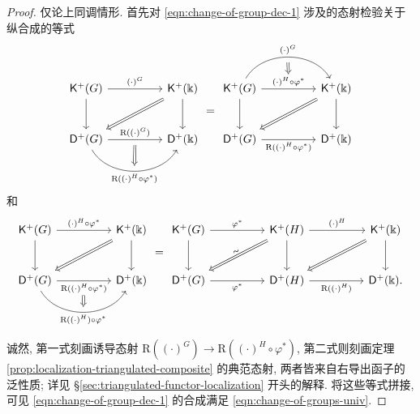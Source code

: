 \begin{proof}
	仅论上同调情形. 首先对 \eqref{eqn:change-of-group-dec-1} 涉及的态射检验关于纵合成的等式
	\[\begin{tikzcd}[column sep=huge, row sep=large]
		\cate{K}^+(G) \arrow[r, "{(\cdot)^G}"] \arrow[d] & \cate{K}^+(\Bbbk) \arrow[d] \arrow[Rightarrow, ld] \\
		\cate{D}^+(G) \arrow[r, "{\mathrm{R}((\cdot)^G)}", ""' {name=D}] \arrow[r, bend right=60, "" {name=U}, "{\mathrm{R}((\cdot)^H \circ \varphi^*)}"'] & \cate{D}^+(\Bbbk) \arrow[Rightarrow, from=D, to=U]
	\end{tikzcd} = \begin{tikzcd}[column sep=huge, row sep=large]
		\cate{K}^+(G) \arrow[r, "{(\cdot)^H \circ \varphi^*}" {name=D}] \arrow[d] \arrow[r, bend left=60, ""' {name=U}, "{(\cdot)^G}"] & \cate{K}^+(\Bbbk) \arrow[d] \arrow[Rightarrow, ld] \\
		\cate{D}^+(G) \arrow[r, "{\mathrm{R}((\cdot)^H \circ \varphi^* ) }"'] & \cate{D}^+(\Bbbk) \arrow[Rightarrow, from=U, to=D]
	\end{tikzcd}\]
	和
	\[\begin{tikzcd}[column sep=huge, row sep=large]
		\cate{K}^+(G) \arrow[r, "{(\cdot)^H \circ \varphi^*}"] \arrow[d] & \cate{K}^+(\Bbbk) \arrow[d] \arrow[Rightarrow, ld] \\
		\cate{D}^+(G) \arrow[r, "{\mathrm{R}((\cdot)^H \circ \varphi^* ) }"' {name=U}] \arrow[r, bend right=60, "{\mathrm{R}((\cdot)^H) \circ \varphi^*}"', "" {name=D}] & \cate{D}^+(\Bbbk) \arrow[Rightarrow, from=U, to=D]
	\end{tikzcd} = \begin{tikzcd}[column sep=huge, row sep=large]
		\cate{K}^+(G) \arrow[d] \arrow[r, "{\varphi^*}"] & \cate{K}^+(H) \arrow[d] \arrow[r, "{(\cdot)^H}"] \arrow[Rightarrow, ld, "\sim" sloped] & \cate{K}^+(\Bbbk) \arrow[d] \arrow[Rightarrow, ld] \\
		\cate{D}^+(G) \arrow[r, "{\varphi^*}"'] & \cate{D}^+(H) \arrow[r, "{\mathrm{R}((\cdot)^H)}"'] & \cate{D}^+(\Bbbk).
	\end{tikzcd}\]

	诚然, 第一式刻画诱导态射 $\mathrm{R}((\cdot)^G) \to \mathrm{R}((\cdot)^H \circ \varphi^*)$, 第二式则刻画定理 \ref{prop:localization-triangulated-composite} 的典范态射, 两者皆来自右导出函子的泛性质; 详见 \S\ref{sec:triangulated-functor-localization} 开头的解释. 将这些等式拼接, 可见 \eqref{eqn:change-of-group-dec-1} 的合成满足 \eqref{eqn:change-of-groups-univ}.
\end{proof}

